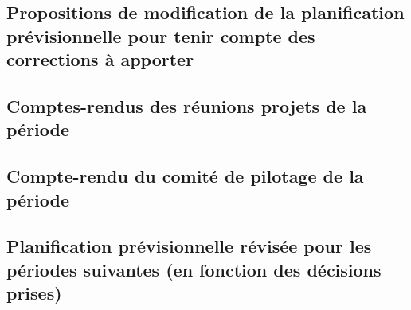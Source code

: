 \documentclass[11pt,a4paper,titlepage,openright]{report}
\begin{document}
    \subsection{Propositions de modification de la planification prévisionnelle pour tenir compte des corrections à apporter}

    \subsection{Comptes-rendus des réunions projets de la période}

    \subsection{Compte-rendu du comité de pilotage de la période}

    \subsection{Planification prévisionnelle révisée pour les périodes suivantes (en fonction des décisions prises)}




    \appendix
\end{document}
